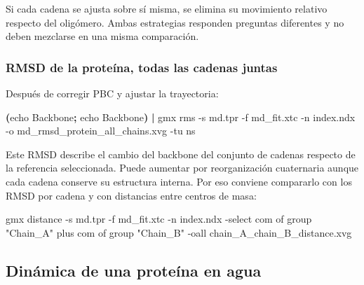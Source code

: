 \documentclass[
  spanish,
  11pt,
  a4paper]{article}
\newenvironment{Shaded}{\begin{snugshade}}{\end{snugshade}}
\newcommand{\AttributeTok}[1]{\textcolor[rgb]{0.13,0.29,0.53}{#1}}
\newcommand{\BuiltInTok}[1]{#1}
\newcommand{\ExtensionTok}[1]{#1}
\newcommand{\KeywordTok}[1]{\textcolor[rgb]{0.13,0.29,0.53}{\textbf{#1}}}
\newcommand{\NormalTok}[1]{#1}
\newcommand{\StringTok}[1]{\textcolor[rgb]{0.31,0.60,0.02}{#1}}
\begin{document}
Si cada cadena se ajusta sobre sí misma, se elimina su movimiento
relativo respecto del oligómero. Ambas estrategias responden preguntas
diferentes y no deben mezclarse en una misma comparación.

\subsubsection{RMSD de la proteína, todas las cadenas
juntas}\label{rmsd-de-la-proteuxedna-todas-las-cadenas-juntas}

Después de corregir PBC y ajustar la trayectoria:

\begin{Shaded}
\begin{Highlighting}[]
\KeywordTok{(}\BuiltInTok{echo}\NormalTok{ Backbone}\KeywordTok{;} \BuiltInTok{echo}\NormalTok{ Backbone}\KeywordTok{)} \KeywordTok{|}
\ExtensionTok{gmx}\NormalTok{ rms     }\AttributeTok{{-}s}\NormalTok{ md.tpr     }\AttributeTok{{-}f}\NormalTok{ md\_fit.xtc     }\AttributeTok{{-}n}\NormalTok{ index.ndx     }\AttributeTok{{-}o}\NormalTok{ md\_rmsd\_protein\_all\_chains.xvg     }\AttributeTok{{-}tu}\NormalTok{ ns}
\end{Highlighting}
\end{Shaded}

Este RMSD describe el cambio del backbone del conjunto de cadenas
respecto de la referencia seleccionada. Puede aumentar por
reorganización cuaternaria aunque cada cadena conserve su estructura
interna. Por eso conviene compararlo con los RMSD por cadena y con
distancias entre centros de masa:

\begin{Shaded}
\begin{Highlighting}[]
\ExtensionTok{gmx}\NormalTok{ distance     }\AttributeTok{{-}s}\NormalTok{ md.tpr     }\AttributeTok{{-}f}\NormalTok{ md\_fit.xtc     }\AttributeTok{{-}n}\NormalTok{ index.ndx     }\AttributeTok{{-}select} \StringTok{\textquotesingle{}com of group "Chain\_A" plus com of group "Chain\_B"\textquotesingle{}}     \AttributeTok{{-}oall}\NormalTok{ chain\_A\_chain\_B\_distance.xvg}
\end{Highlighting}
\end{Shaded}

\subsection{Dinámica de una proteína en
agua}\label{dinuxe1mica-de-una-proteuxedna-en-agua}
\end{document}
